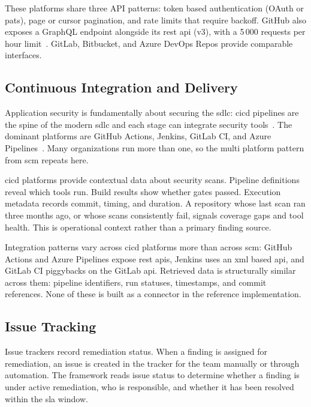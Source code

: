 These platforms share three API patterns: token based authentication (OAuth or \glspl{pat}), page or cursor pagination, and rate limits that require backoff. GitHub also exposes a GraphQL endpoint alongside its \gls{rest} \gls{api} (v3), with a 5\,000 requests per hour limit~\cite{GitHubAPI2024, GitHubRateLimits2024}. GitLab, Bitbucket, and Azure DevOps Repos provide comparable interfaces.


\subsection{Continuous Integration and Delivery}

Application security is fundamentally about securing the \gls{sdlc}: \gls{cicd} pipelines are the spine of the modern \gls{sdlc} and each stage can integrate security tools~\cite{Forsgren2018}. The dominant platforms are GitHub Actions, Jenkins, GitLab CI, and Azure Pipelines~\cite{JetBrains2025CICD}. Many organizations run more than one, so the multi platform pattern from \gls{scm} repeats here.

\Gls{cicd} platforms provide contextual data about security scans. Pipeline definitions reveal which tools run. Build results show whether gates passed. Execution metadata records commit, timing, and duration. A repository whose last scan ran three months ago, or whose scans consistently fail, signals coverage gaps and tool health. This is operational context rather than a primary finding source.

Integration patterns vary across \gls{cicd} platforms more than across \gls{scm}: GitHub Actions and Azure Pipelines expose \gls{rest} \glspl{api}, Jenkins uses an \gls{xml} based \gls{api}, and GitLab CI piggybacks on the GitLab \gls{api}. Retrieved data is structurally similar across them: pipeline identifiers, run statuses, timestamps, and commit references. None of these is built as a connector in the reference implementation.


\subsection{Issue Tracking}

Issue trackers record remediation status. When a finding is assigned for remediation, an issue is created in the tracker for the team manually or through automation. The framework reads issue status to determine whether a finding is under active remediation, who is responsible, and whether it has been resolved within the \gls{sla} window.

